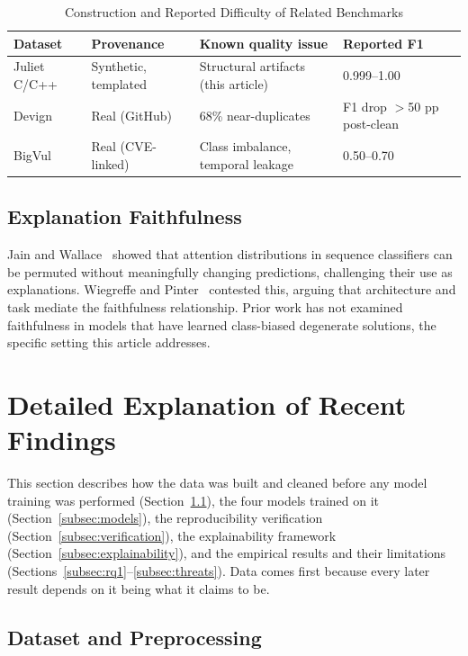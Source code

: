 \documentclass{ieeeaccess}
\begin{document}
\begin{table}[t]
\centering
\caption{Construction and Reported Difficulty of Related Benchmarks}
\label{tab:related-benchmarks}
\begin{tabular}{@{}p{}p{}p{}p{}@{}}
\toprule
\textbf{Dataset} & \textbf{Provenance} & \textbf{Known quality issue} & \textbf{Reported F1} \\
\midrule
Juliet C/C++ & Synthetic, templated & Structural artifacts (this article) & 0.999--1.00 \\[2pt]
Devign & Real (GitHub) & 68\% near-duplicates~\cite{ref1} & F1 drop $>$50 pp post-clean \\[2pt]
BigVul & Real (CVE-linked) & Class imbalance, temporal leakage & 0.50--0.70 \\
\bottomrule
\end{tabular}
\end{table}

\subsection{Explanation Faithfulness}
\label{subsec:bg-faithfulness}
Jain and Wallace~\cite{ref25} showed that attention distributions in sequence classifiers can be permuted without meaningfully changing predictions, challenging their use as explanations. Wiegreffe and Pinter~\cite{ref26} contested this, arguing that architecture and task mediate the faithfulness relationship. Prior work has not examined faithfulness in models that have learned class-biased degenerate solutions, the specific setting this article addresses.

\section{Detailed Explanation of Recent Findings}
\label{sec:findings}
This section describes how the data was built and cleaned before any model training was performed (Section~\ref{subsec:data}), the four models trained on it (Section~\ref{subsec:models}), the reproducibility verification (Section~\ref{subsec:verification}), the explainability framework (Section~\ref{subsec:explainability}), and the empirical results and their limitations (Sections~\ref{subsec:rq1}--\ref{subsec:threats}). Data comes first because every later result depends on it being what it claims to be.

\subsection{Dataset and Preprocessing}
\label{subsec:data}
\end{document}
